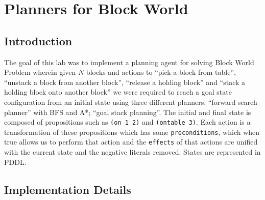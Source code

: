 \documentclass{article}
\begin{document}
\maketitle
\section{Planners for Block World}
\subsection{Introduction}
The goal of this lab was to implement a planning agent for solving Block World Problem wherein given $N$ blocks and actions to ``pick a block from table'', ``unstack a block from another block'', ``release a holding block'' and ``stack a holding block onto another block'' we were required to reach a goal state configuration from an initial state using three different planners, ``forward search planner'' with BFS and A*; ``goal stack planning''. The initial and final state is composed of propositions such as \verb|(on 1 2)| and \verb|(ontable 3)|. Each action is a transformation of these propositions which has some \verb|preconditions|, which when true allows us to perform that action and the \verb|effects| of that actions are unified with the current state and the negative literals removed. States are represented in PDDL.

\subsection{Implementation Details}
\end{document}
